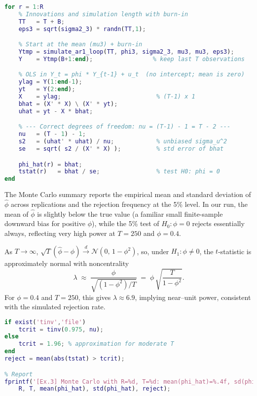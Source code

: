 \documentclass[dvipsnames,11pt]{article}
\begin{document}
\begin{solution}
\begin{lstlisting}[language=Matlab]
for r = 1:R
    % Innovations and simulation length with burn-in
    TT   = T + B;
    eps3 = sqrt(sigma2_3) * randn(TT,1);

    % Start at the mean (mu3) + burn-in
    Ytmp = simulate_ar1_loop(TT, phi3, sigma2_3, mu3, mu3, eps3);
    Y    = Ytmp(B+1:end);                 % keep last T observations

    % OLS in Y_t = phi * Y_{t-1} + u_t  (no intercept; mean is zero)
    ylag = Y(1:end-1);
    yt   = Y(2:end);
    X    = ylag;                           % (T-1) x 1
    bhat = (X' * X) \ (X' * yt);
    uhat = yt - X * bhat;

    % --- Correct degrees of freedom: nu = (T-1) - 1 = T - 2 ---
    nu   = (T - 1) - 1;
    s2   = (uhat' * uhat) / nu;            % unbiased sigma_u^2
    se   = sqrt( s2 / (X' * X) );          % std error of bhat

    phi_hat(r) = bhat;
    tstat(r)   = bhat / se;                % test H0: phi = 0
end
\end{lstlisting}

        The Monte Carlo summary reports the empirical mean and standard deviation of $\widehat\phi$ across replications and the rejection frequency at the 5\% level. In our run, the mean of $\widehat\phi$ is slightly below the true value (a familiar small finite-sample downward bias for positive $\phi$), while the 5\% test of $H_0\!:\phi=0$ rejects essentially always, reflecting very high power at $T=250$ and $\phi=0.4$.

        \begin{remark}
            As $T\to\infty$, $\sqrt{T}(\widehat\phi-\phi)\overset{d}{\to}\mathcal{N}\!\left(0,\,1-\phi^2\right)$, so, under $H_1\!:\phi\neq0$, the $t$-statistic is approximately normal with noncentrality
            \[
              \lambda \;\approx\; \frac{\phi}{\sqrt{(1-\phi^2)/T}}
              \;=\; \phi\,\sqrt{\frac{T}{1-\phi^2}}.
            \]
            For $\phi=0.4$ and $T=250$, this gives $\lambda\approx 6.9$, implying near–unit power, consistent with the simulated rejection rate.
        \end{remark}

\begin{lstlisting}[language=Matlab]
% Rejection frequency at 5%
if exist('tinv','file')
    tcrit = tinv(0.975, nu);
else
    tcrit = 1.96; % approximation for moderate T
end
reject = mean(abs(tstat) > tcrit);

% Report
fprintf('[Ex.3] Monte Carlo with R=%d, T=%d: mean(phi_hat)=%.4f, sd(phi_hat)=%.4f, reject H0 at 5%% = %.3f\n', ...
    R, T, mean(phi_hat), std(phi_hat), reject);


\end{lstlisting}
\end{solution}
\end{document}
